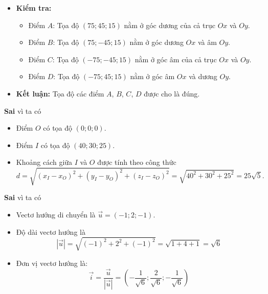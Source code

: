 \begin{ex}
{\begin{itemchoice}
\begin{itemize}
\begin{itemize}
				\item Các flycam được đặt cách đều mặt đất $30$ m. Thiết bị điều khiển trung tâm $O$ cách mặt đất $15$ m, do đó điểm $O$ có tọa độ $(0;0;0)$ trong hệ trục này (vì chiều $Oz$ dương hướng lên trên).
				\item Các điểm $A$, $B$, $C$, $D$ nằm trên các đường thẳng vuông góc với sân vận động tại các góc, cách mặt đất $30$ m, nên tọa độ của chúng sẽ có hoành độ và tung độ tương ứng với các góc của sân và hoành độ $z = 15$ (vì $O$ cách mặt đất $15$ m, và flycam cách $30$ m mặt đất nên $z = 15$).
			\end{itemize}
			\item \textbf{Kiểm tra:}
			\begin{itemize}
				\item Điểm $A$: Tọa độ $(75; 45; 15)$ nằm ở góc dương của cả trục $Ox$ và $Oy$.
				\item Điểm $B$: Tọa độ $(75; -45; 15)$ nằm ở góc dương $Ox$ và âm $Oy$.
				\item Điểm $C$: Tọa độ $(-75; -45; 15)$ nằm ở góc âm của cả trục $Ox$ và $Oy$.
				\item Điểm $D$: Tọa độ $(-75; 45; 15)$ nằm ở góc âm $Ox$ và dương $Oy$.
			\end{itemize}
			\item \textbf{Kết luận:} Tọa độ các điểm $A$, $B$, $C$, $D$ được cho là đúng.
	\end{itemize}
	\itemch \textbf{Sai} vì ta có
	   \begin{itemize}
		   \item Điểm $O$ có tọa độ $(0;0;0)$.
		   \item Điểm $I$ có tọa độ $(40;30;25)$.
		   \item Khoảng cách giữa $I$ và $O$ được tính theo công thức
		   $$
		   d = \sqrt{(x_I - x_O)^2 + (y_I - y_O)^2 + (z_I - z_O)^2} = \sqrt{40^2 + 30^2 + 25^2}=25\sqrt{5}.
		   $$
	   \end{itemize}
	\itemch \textbf{Sai} vì ta có
	   \begin{itemize}
		   \item Vectơ hướng di chuyển là $\overrightarrow{u} = (-1;2;-1)$.
		   \item Độ dài vectơ hướng là
		   $$
		   \left|\overrightarrow{u}\right| = \sqrt{(-1)^2 + 2^2 + (-1)^2} = \sqrt{1 + 4 + 1} = \sqrt{6}
		   $$
		   \item Đơn vị vectơ hướng là:
		   $$
		   \overrightarrow{i} =\dfrac{\overrightarrow{u}}{\left|\overrightarrow{u}\right|}= \left( -\dfrac{1}{\sqrt{6}} ; \dfrac{2}{\sqrt{6}} ; -\dfrac{1}{\sqrt{6}} \right)
$$
\end{itemize}
\end{itemchoice}}
\end{ex}
